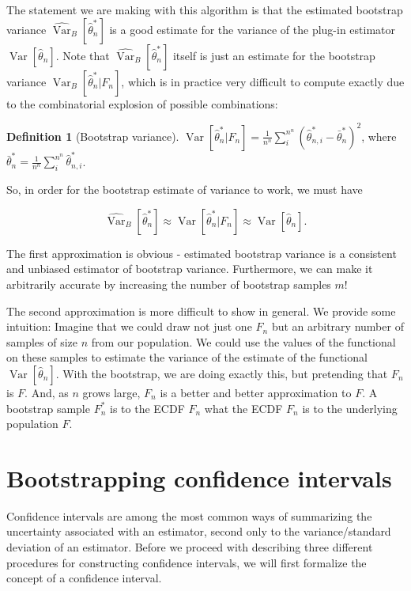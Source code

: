 \documentclass{book}
\theoremstyle{plain}%
\theoremstyle{definition}
\newtheorem{definition}{Definition}[section]
\DeclareMathOperator{\Var}{Var}
\begin{document}
The statement we are making with this algorithm is that the estimated bootstrap variance $\widehat{\Var}_B[\hat{\theta}^*_n]$ is a good estimate for the variance of the plug-in estimator $\Var[\hat{\theta}_n]$. Note that $\widehat{\Var}_B[\hat{\theta}^*_n]$ itself is just an estimate for the bootstrap variance $\Var_B[\hat{\theta}^*_n| F_n]$, which is in practice very difficult to compute exactly due to the combinatorial explosion of possible combinations:

\begin{definition}[Bootstrap variance]
$\Var[\hat{\theta}^*_n| F_n] = \frac{1}{n^n} \sum_{i}^{n^n}  \left(\hat{\theta}^*_{n,i} - \bar{\theta}^*_n\right)^2$, where $\bar{\theta}^*_n = \frac{1}{n^n} \sum_{i}^{n^n} \hat{\theta}^*_{n,i}$.
\end{definition}

So, in order for the bootstrap estimate of variance to work, we must have

$$\widehat{\Var}_B[\hat{\theta}^*_n] \approx \Var[\hat{\theta}^*_n| F_n] \approx \Var[\hat{\theta}_n].$$

The first approximation is obvious - estimated bootstrap variance is a consistent and unbiased estimator of bootstrap variance. Furthermore, we can make it arbitrarily accurate by increasing the number of bootstrap samples $m$!

The second approximation is more difficult to show in general. We provide some intuition: Imagine that we could draw not just one $F_n$ but an arbitrary number of samples of size $n$ from our population. We could use the values of the functional on these samples to estimate the variance of the estimate of the functional $\Var[\hat{\theta}_n]$. With the bootstrap, we are doing exactly this, but pretending that $F_n$ is $F$. And, as $n$ grows large, $F_n$ is a better and better approximation to $F$. A bootstrap sample $F^*_n$ is to the ECDF $F_n$ what the ECDF $F_n$ is to the underlying population $F$.


\section{Bootstrapping confidence intervals}

Confidence intervals are among the most common ways of summarizing the uncertainty associated with an estimator, second only to the variance/standard deviation of an estimator. Before we proceed with describing three different procedures for constructing confidence intervals, we will first formalize the concept of a confidence interval.
\end{document}

